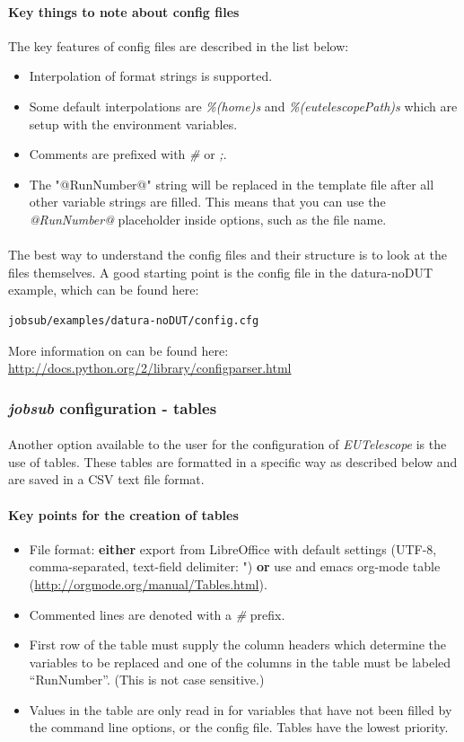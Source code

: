 \documentclass[11pt]{article}
\begin{document}
\paragraph{Key things to note about config files} The key features of config files are described in the list below:
\begin{itemize}
\item Interpolation of format strings is supported.
\item Some default interpolations are \textit{\%(home)s} and \textit{\%(eutelescopePath)s} which are setup with the environment variables.
\item Comments are prefixed with \textit{\#} or \textit{;}.
\item The "@RunNumber@" string will be replaced in the template file after all other variable strings are filled. This means that you can use the \textit{@RunNumber@} placeholder inside options, such as the file name.
\end{itemize}
\paragraph{}
The best way to understand the config files and their structure is to look at the files themselves. A good starting point is the config file in the datura-noDUT example, which can be found here:
\begin{verbatim}
jobsub/examples/datura-noDUT/config.cfg
\end{verbatim} 
More information on can be found here: \url{http://docs.python.org/2/library/configparser.html}
\subsubsection{\textit{jobsub} configuration - tables}
\paragraph{}
Another option available to the user for the configuration of \textit{EUTelescope} is the use of tables. These tables are formatted in a specific way as described below and are saved in a CSV text file format.
\paragraph{Key points for the creation of tables}
\begin{itemize}
\item File format: \textbf{either} export from LibreOffice with default settings (UTF-8, comma-separated, text-field delimiter: ") \textbf{or} use and emacs org-mode table (\url{http://orgmode.org/manual/Tables.html}).
\item Commented lines are denoted with a \textit{\#} prefix.
\item First row of the table must supply the column headers which determine the variables to be replaced and one of the columns in the table must be labeled ``RunNumber''. (This is not case sensitive.)
\item Values in the table are only read in for variables that have not been filled by the command line options, or the config file. Tables have the lowest priority.
\end{itemize}
\end{document}
